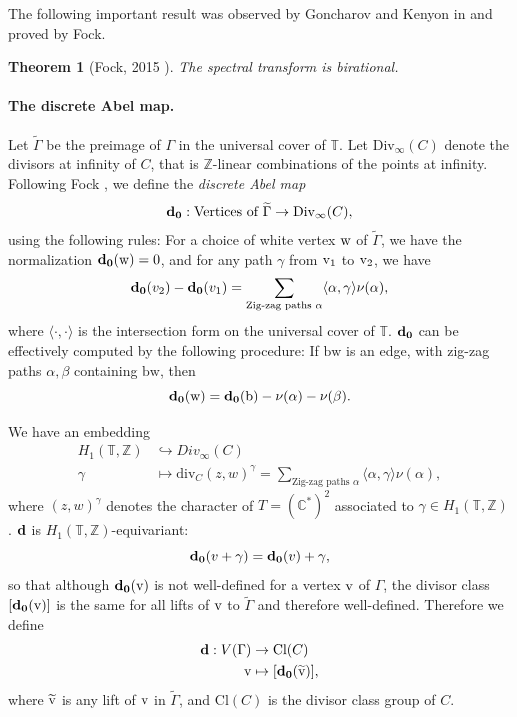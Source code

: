 \documentclass[11pt]{article} %
\newtheorem{theorem}{Theorem}[section]
\theoremstyle{definition}
\newcommand{\Z}{{\mathbb Z}}
\newcommand{\C}{{\mathbb C}}
\newcommand{\T}{{\mathbb T}}
\newcommand{\ra}{\rightarrow}
\newcommand{\be}{\begin{equation}}
\newcommand{\ee}{\end{equation}}
\newcommand{\la}{\label}
\begin{document}
The following important result was observed by Goncharov and Kenyon in \cite{GK12} and proved by Fock. 
\begin{theorem}[Fock, 2015 \cite{F15}] \label{bir}
The spectral transform is birational.
\end{theorem}


\paragraph{The discrete Abel map.}

Let $\widetilde \Gamma$ be the preimage of $\Gamma$ in the universal cover of $\T$. Let $\text{Div}_\infty(C)$ denote the divisors at infinity of $C$, that is $\Z$-linear combinations of the points at infinity. Following Fock \cite{F15}, we define the \textit{discrete Abel map}
\begin{align*}
{\bf d_0}:\text{Vertices of }\widetilde \Gamma \ra \text{Div}_\infty(C),
\end{align*}
using the following rules: For a choice of white vertex $\text w$ of $\widetilde \Gamma$, we have the normalization ${\bf d_0}({ \text w})=0$, and for any path $\gamma$ from $\text v_1$ to $\text v_2$, we have
\be \la{damprop}
{\bf d_0}(v_2)-{\bf d_0}(v_1)=\sum_{\text{Zig-zag paths }\alpha }\langle \alpha,\gamma \rangle \nu(\alpha),
\ee
where $\langle \cdot , \cdot \rangle$ is the intersection form on the universal cover of $\T$.
${\bf d_0}$ can be effectively computed by the following procedure: If $\text{bw}$ is an edge, with zig-zag paths $\alpha,\beta$ containing $\text{bw}$, then 
$$
{\bf d_0}(\text w)={\bf d_0}(\text b)-\nu(\alpha)-\nu(\beta).
$$

We have an embedding
\begin{align}
H_1(\T,\Z) &\hookrightarrow  Div_\infty(C) \nonumber\\
\gamma &\mapsto \text{div}_{C} (z,w)^\gamma=\sum_{\text{Zig-zag paths }\alpha }\langle \alpha,\gamma \rangle \nu(\alpha), \la{homologydivisor}
\end{align}
 where $(z,w)^\gamma$ denotes the character of $T=(\C^*)^2$ associated to $\gamma \in H_1(\T,\Z)$. ${\bf d}$ is $H_1(\T,\Z)$-equivariant:
 $$
 {\bf d_0}(v+\gamma)={\bf d_0}(v)+\gamma,
 $$
so that although ${\bf d_0}(\text v)$ is not well-defined for a vertex $\text v$ of $\Gamma$, the divisor class $[{\bf d_0}(\text v)]$ is the same for all lifts of $\text v$ to $\widetilde{\Gamma}$ and therefore well-defined. Therefore we define
\begin{align*}
    {\bf d}: V(\Gamma) &\ra \text{Cl}(C)\\
    \text v &\mapsto [{\bf d_0}(\widetilde {\text v})],
\end{align*}
where $\widetilde{\text v}$ is any lift of $\text v$ in $\widetilde \Gamma$, and $\text{Cl}(C)$ is the divisor class group of $C$.
\end{document}
